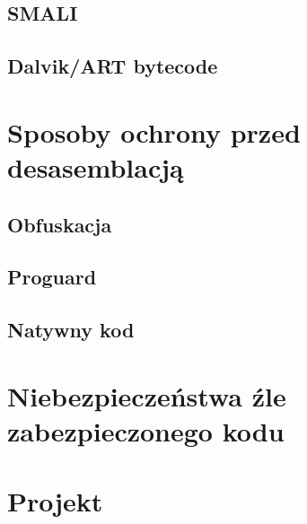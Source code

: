 \documentclass[12pt,a4paper,leqno,oneside,titlepage]{book}
\begin{document}
\section{SMALI}
\section{Dalvik/ART bytecode}


\chapter{Sposoby ochrony przed desasemblacją}
\section{Obfuskacja}
\section{Proguard}
\section{Natywny kod}


\chapter{Niebezpieczeństwa źle zabezpieczonego kodu}


\chapter{Projekt}
\end{document}
